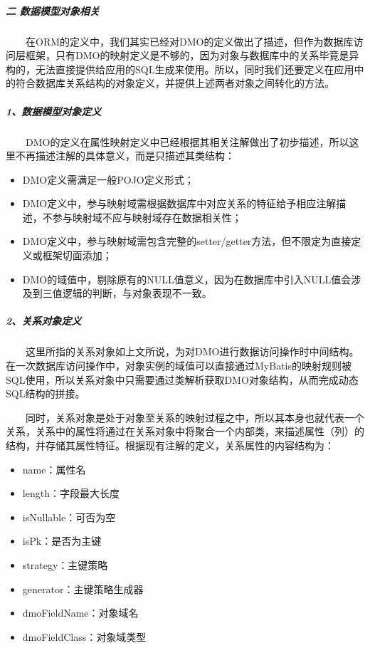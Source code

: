 \documentclass[]{article}
\begin{document}
\subparagraph{二
数据模型对象相关}\label{ux4e8c-ux6570ux636eux6a21ux578bux5bf9ux8c61ux76f8ux5173}

　　在ORM的定义中，我们其实已经对DMO的定义做出了描述，但作为数据库访问层框架，只有DMO的映射定义是不够的，因为对象与数据库中的关系毕竟是异构的，无法直接提供给应用的SQL生成来使用。所以，同时我们还要定义在应用中的符合数据库关系结构的对象定义，并提供上述两者对象之间转化的方法。

\subparagraph{1、数据模型对象定义}\label{ux6570ux636eux6a21ux578bux5bf9ux8c61ux5b9aux4e49}

　　DMO的定义在属性映射定义中已经根据其相关注解做出了初步描述，所以这里不再描述注解的具体意义，而是只描述其类结构：

\begin{itemize}
\itemsep1pt\parskip0pt
\item
  DMO定义需满足一般POJO定义形式；
\item
  DMO定义中，参与映射域需根据数据库中对应关系的特征给予相应注解描述，不参与映射域不应与映射域存在数据相关性；
\item
  DMO定义中，参与映射域需包含完整的setter/getter方法，但不限定为直接定义或框架切面添加；
\item
  DMO的域值中，剔除原有的NULL值意义，因为在数据库中引入NULL值会涉及到三值逻辑的判断，与对象表现不一致。
\end{itemize}

\subparagraph{2、关系对象定义}\label{ux5173ux7cfbux5bf9ux8c61ux5b9aux4e49}

　　这里所指的关系对象如上文所说，为对DMO进行数据访问操作时中间结构。在一次数据库访问操作中，对象实例的域值可以直接通过MyBatis的映射规则被SQL使用，所以关系对象中只需要通过类解析获取DMO对象结构，从而完成动态SQL结构的拼接。

　　同时，关系对象是处于对象至关系的映射过程之中，所以其本身也就代表一个关系，关系中的属性将通过在关系对象中将聚合一个内部类，来描述属性（列）的结构，并存储其属性特征。根据现有注解的定义，关系属性的内容结构为：

\begin{itemize}
\itemsep1pt\parskip0pt
\item
  name：属性名
\item
  length：字段最大长度
\item
  isNullable：可否为空
\item
  isPk：是否为主键
\item
  strategy：主键策略
\item
  generator：主键策略生成器
\item
  dmoFieldName：对象域名
\item
  dmoFieldClass：对象域类型
\end{itemize}
\end{document}
